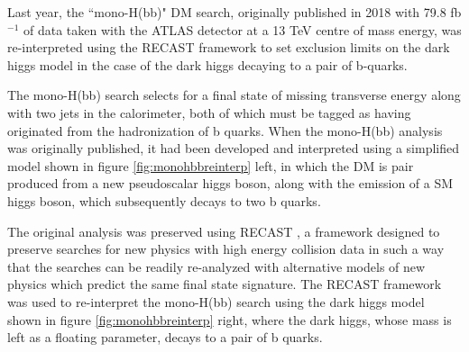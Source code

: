 \documentclass[12pt]{article}
\begin{document}
Last year, the ``mono-H(bb)" DM search, originally published in 2018 \cite{monohbb} with 79.8 fb$^{-1}$ of data taken with the ATLAS detector at a 13 TeV centre of mass energy, was re-interpreted \cite{monohbb_recast} using the RECAST framework \cite{recast} to set exclusion limits on the dark higgs model in the case of the dark higgs decaying to a pair of b-quarks. 

The mono-H(bb) search selects for a final state of missing transverse energy along with two jets in the calorimeter, both of which must be tagged as having originated from the hadronization of b quarks. When the mono-H(bb) analysis was originally published, it had been developed and interpreted using a simplified model shown in figure \ref{fig:monohbbreinterp} left, in which the DM is pair produced from a new pseudoscalar higgs boson, along with the emission of a SM higgs boson, which subsequently decays to two b quarks.  

The original analysis was preserved using RECAST \cite{recast}, a framework designed to preserve searches for new physics with high energy collision data in such a way that the searches can be readily re-analyzed with alternative models of new physics which predict the same final state signature. The RECAST framework was used to re-interpret the mono-H(bb) search using the dark higgs model shown in figure \ref{fig:monohbbreinterp} right, where the dark higgs, whose mass is left as a floating parameter, decays to a pair of b quarks. 
\end{document}
